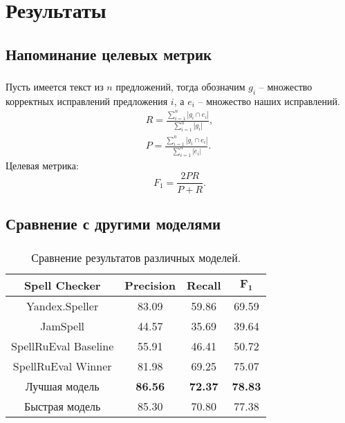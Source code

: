 \documentclass[t]{beamer}  %
\begin{document}
\section{Результаты}
\subsection{Напоминание целевых метрик}
\begin{frame}
	\frametitle{\insertsection} 
	\framesubtitle{\insertsubsection}
		Пусть имеется текст из $n$ предложений, тогда обозначим $g_i$ -- множество корректных исправлений предложения $i$, а $e_i$ -- множество наших исправлений. 
		\begin{gather*}
			R = \frac{\sum_{i=1}^n |g_i \cap e_i|}{\sum_{i=1}^n |g_i|},
			\\
			P = \frac{\sum_{i=1}^n |g_i \cap e_i|}{\sum_{i=1}^n |e_i|}.
		\end{gather*}
		Целевая метрика:
		\begin{equation*}
			F_1 = \frac{2 P R}{P + R}.
		\end{equation*}
			
\end{frame}

\subsection{Сравнение с другими моделями}
\begin{frame}
	\frametitle{\insertsection} 
	\framesubtitle{\insertsubsection}
		\begin{table}
		\begin{center}
			\small
			\begin{tabular}{c|c|c|c}
				\hline
				\textbf{Spell Checker} & \textbf{Precision}  & \textbf{Recall} & $\boldsymbol{F_1}$  \\
				\hline
				Yandex.Speller & 83.09  & 59.86 & 69.59  \\
				JamSpell & 44.57 & 35.69 & 39.64 \\
				SpellRuEval Baseline & 55.91 & 46.41 & 50.72  \\
				SpellRuEval Winner & 81.98 & 69.25 & 75.07  \\
				Лучшая модель & \textbf{86.56} & \textbf{72.37} & \textbf{78.83} \\
				Быстрая модель & 85.30 & 70.80 & 77.38 \\
				\hline
			\end{tabular}
		\end{center}
		\caption{Сравнение результатов различных моделей.}
	\end{table}
\end{frame}
\end{document}
